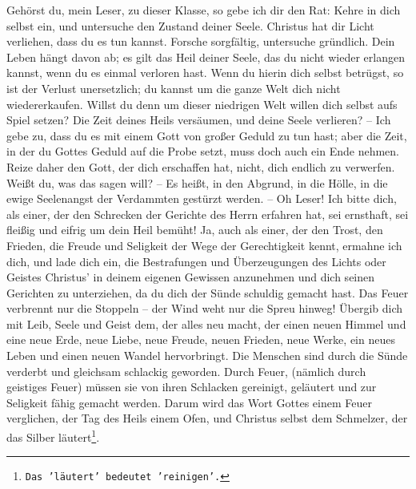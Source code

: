 Gehörst du, mein Leser, zu dieser Klasse, so gebe ich dir den Rat: Kehre in dich
selbst ein, und untersuche den Zustand deiner Seele. Christus hat dir Licht
verliehen, dass du es tun kannst. Forsche sorgfältig, untersuche gründlich. Dein
Leben hängt davon ab; es gilt das Heil deiner Seele, das du nicht wieder
erlangen kannst, wenn du es einmal verloren hast. Wenn du hierin dich selbst
betrügst, so ist der Verlust unersetzlich; du kannst um die ganze Welt dich
nicht wiedererkaufen. Willst du denn um dieser niedrigen Welt willen dich selbst
aufs Spiel setzen? Die Zeit deines Heils versäumen, und deine Seele verlieren?
-- Ich gebe zu, dass du es mit einem Gott von großer Geduld zu tun hast; aber
die Zeit, in der du Gottes Geduld auf die Probe setzt, muss doch auch ein Ende
nehmen. Reize daher den Gott, der dich erschaffen hat, nicht, dich endlich zu
verwerfen. Weißt du, was das sagen will? -- Es heißt, in den Abgrund, in die
Hölle, in die ewige Seelenangst der Verdammten gestürzt werden. -- Oh Leser! Ich
bitte dich, als einer, der den Schrecken der Gerichte des Herrn erfahren hat,
sei ernsthaft, sei fleißig und eifrig um dein Heil bemüht! Ja, auch als einer,
der den Trost, den Frieden, die Freude und Seligkeit der Wege der Gerechtigkeit
kennt, ermahne ich dich, und lade dich ein, die Bestrafungen und Überzeugungen
des Lichts oder Geistes Christus' in deinem eigenen Gewissen anzunehmen und
dich seinen Gerichten zu unterziehen, da du dich der Sünde schuldig gemacht
hast. Das Feuer verbrennt nur die Stoppeln -- der Wind weht nur die Spreu
hinweg! Übergib dich mit Leib, Seele und Geist dem, der alles neu macht, der
einen neuen Himmel und eine neue Erde, neue Liebe, neue Freude, neuen Frieden,
neue Werke, ein neues Leben und einen neuen Wandel hervorbringt. Die Menschen
sind durch die Sünde verderbt und gleichsam schlackig geworden. Durch Feuer,
(nämlich durch geistiges Feuer) müssen sie von ihren Schlacken gereinigt,
geläutert und zur Seligkeit fähig gemacht werden. Darum wird das Wort Gottes
einem Feuer verglichen, der Tag des Heils einem Ofen, und Christus selbst dem
Schmelzer, der das Silber läutert\footnote{\texttt{Das 'läutert' bedeutet
'reinigen'.}}.

\medskip

